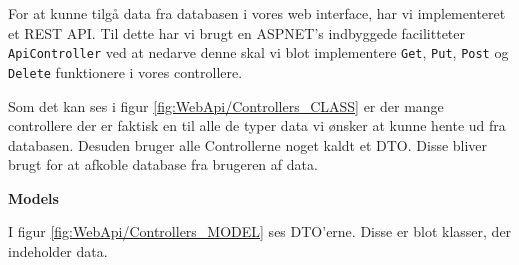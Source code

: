 For at kunne tilgå data fra databasen i vores web interface, har vi implementeret et \gls{REST} \gls{API}. Til dette har vi brugt en \gls{ASPNET}'s indbyggede facilitteter \texttt{ApiController} ved at nedarve denne skal vi blot implementere \texttt{Get}, \texttt{Put}, \texttt{Post} og \texttt{Delete} funktionere i vores controllere.


Som det kan ses i figur \ref{fig:WebApi/Controllers_CLASS} er der mange controllere der er faktisk en til alle de typer data vi ønsker at kunne hente ud fra databasen. Desuden bruger alle Controllerne noget kaldt et \gls{DTO}. Disse bliver brugt for at afkoble database fra brugeren af data.
\newline

\textbf{Models}

I figur \ref{fig:WebApi/Controllers_MODEL} ses \gls{DTO}'erne. Disse er blot klasser, der indeholder data.

